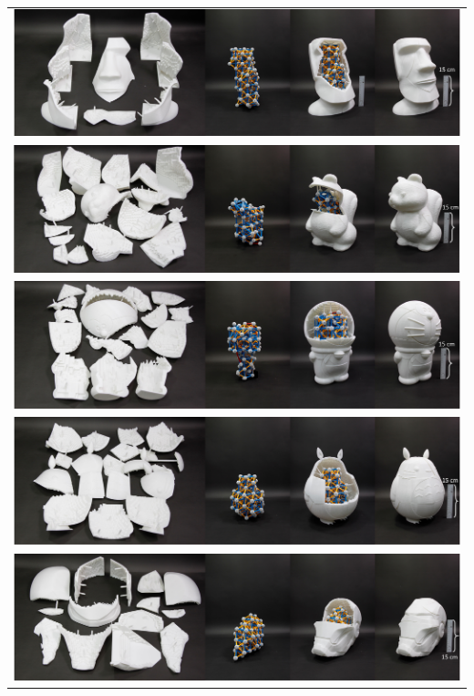  \begin{table}[ht]
 \centering
 \resizebox{0.922\linewidth}{!} {
 \begin{tabular}{c} 
 \includegraphics{figs/MOAI_real.pdf} \\
 \includegraphics{figs/squirrel_real.pdf}\\
 \includegraphics{figs/doraemon_real.pdf}\\
 \includegraphics{figs/totoro_real.pdf}\\
 \includegraphics{figs/iron_real.pdf}\\
 \end{tabular}
 }
 \caption{}
 \label{tab:result_ZomeFab_real}
 \end{table}

